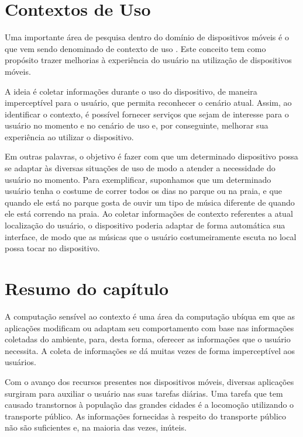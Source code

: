 \section{Contextos de Uso}
\label{sc:contextoDeUso}
Uma importante área de pesquisa dentro do domínio de dispositivos móveis é o que vem sendo denominado de contexto de uso \citep{carmo2012}. Este conceito tem como propósito trazer melhorias à experiência do usuário na utilização de dispositivos móveis.  

A ideia é coletar informações durante o uso do dispositivo, de maneira imperceptível para o usuário, que permita reconhecer o cenário atual.  Assim, ao identificar o contexto, é possível fornecer serviços que sejam de interesse para o usuário no momento e no cenário de uso e, por conseguinte, melhorar  sua experiência ao utilizar o dispositivo.

Em outras palavras, o objetivo é fazer com que um determinado dispositivo possa se adaptar às diversas situações de uso de modo a atender a necessidade do usuário no momento. Para exemplificar, suponhamos que um determinado usuário tenha o costume de correr todos os dias no parque ou na praia, e que quando ele está no parque gosta de ouvir um tipo de música diferente de quando ele está correndo na praia. Ao coletar informações de contexto referentes a atual localização do usuário,  o dispositivo poderia adaptar de forma automática sua interface, de modo que as músicas que o usuário costumeiramente escuta no local possa tocar no dispositivo. 

\section{Resumo do capítulo}
\label{sc:resumoUbicomp}

A computação sensível ao contexto é uma área da computação ubíqua em que as aplicações modificam ou adaptam seu comportamento com base nas informações coletadas do ambiente, para, desta forma, oferecer as informações que o usuário necessita. A coleta de informações se dá muitas vezes de forma imperceptível aos usuários.

Com o avanço dos recursos presentes nos dispositivos móveis, diversas aplicações surgiram para auxiliar o usuário nas suas tarefas diárias. Uma tarefa que tem causado transtornos à população das grandes cidades é a locomoção utilizando o transporte público. As informações fornecidas à respeito do transporte público não são suficientes e, na maioria das vezes, inúteis.

